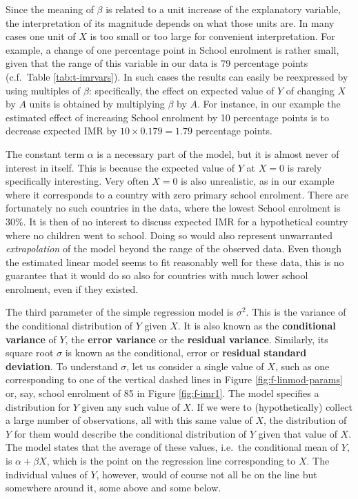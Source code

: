 \documentclass[11pt,a4paper,openany]{book}
\begin{document}
Since the meaning of \(\beta\) is related to a unit increase of the
explanatory variable, the interpretation of its magnitude depends on
what those units are. In many cases one unit of \(X\) is too small or
too large for convenient interpretation. For example, a change of one
percentage point in School enrolment is rather small, given that the
range of this variable in our data is 79 percentage points (c.f.~Table
\ref{tab:t-imrvars}). In such cases the results can easily be
reexpressed by using multiples of \(\beta\): specifically, the effect on
expected value of \(Y\) of changing \(X\) by \(A\) units is obtained by
multiplying \(\beta\) by \(A\). For instance, in our example the
estimated effect of increasing School enrolment by 10 percentage points
is to decrease expected IMR by \(10\times 0.179=1.79\) percentage
points.

The constant term \(\alpha\) is a necessary part of the model, but it is
almost never of interest in itself. This is because the expected value
of \(Y\) at \(X=0\) is rarely specifically interesting. Very often
\(X=0\) is also unrealistic, as in our example where it corresponds to a
country with zero primary school enrolment. There are fortunately no
such countries in the data, where the lowest School enrolment is 30\%.
It is then of no interest to discuss expected IMR for a hypothetical
country where no children went to school. Doing so would also represent
unwarranted \emph{extrapolation} of the model beyond the range of the
observed data. Even though the estimated linear model seems to fit
reasonably well for these data, this is no guarantee that it would do so
also for countries with much lower school enrolment, even if they
existed.

The third parameter of the simple regression model is \(\sigma^{2}\).
This is the variance of the conditional distribution of \(Y\) given
\(X\). It is also known as the \textbf{conditional variance} of \(Y\),
the \textbf{error variance} or the \textbf{residual variance}.
Similarly, its square root \(\sigma\) is known as the conditional, error
or \textbf{residual standard deviation}. To understand \(\sigma\), let
us consider a single value of \(X\), such as one corresponding to one of
the vertical dashed lines in Figure \ref{fig:f-linmod-params} or, say,
school enrolment of 85 in Figure \ref{fig:f-imr1}. The model specifies a
distribution for \(Y\) given any such value of \(X\). If we were to
(hypothetically) collect a large number of observations, all with this
same value of \(X\), the distribution of \(Y\) for them would describe
the conditional distribution of \(Y\) given that value of \(X\). The
model states that the average of these values, i.e.~the conditional mean
of \(Y\), is \(\alpha+\beta X\), which is the point on the regression
line corresponding to \(X\). The individual values of \(Y\), however,
would of course not all be on the line but somewhere around it, some
above and some below.
\end{document}
